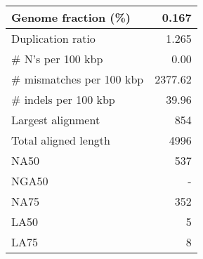\documentclass[12pt,a4paper]{article}
\begin{document}
\begin{table}[ht]
\begin{center}
\begin{tabular}{|l*{1}{|r}|}
Genome fraction (\%) & 0.167 \\ \hline
Duplication ratio & 1.265 \\ \hline
\# N's per 100 kbp & 0.00 \\ \hline
\# mismatches per 100 kbp & 2377.62 \\ \hline
\# indels per 100 kbp & 39.96 \\ \hline
Largest alignment & 854 \\ \hline
Total aligned length & 4996 \\ \hline
NA50 & 537 \\ \hline
NGA50 & - \\ \hline
NA75 & 352 \\ \hline
LA50 & 5 \\ \hline
LA75 & 8 \\ \hline
\end{tabular}
\end{center}
\end{table}
\end{document}
